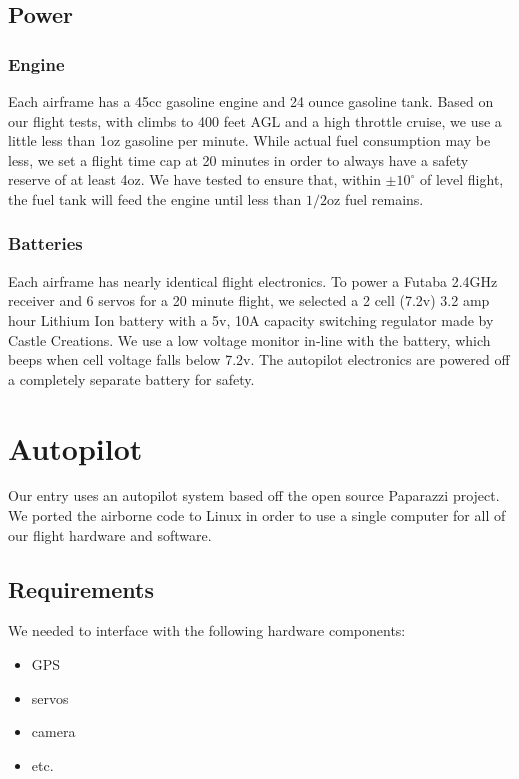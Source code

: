 \documentclass[10pt]{report}
\newcommand{\degrees}[1]
{
\begin{math}
#1^{\circ} 
\end{math}
}
\begin{document}
\subsection{Power}

\subsubsection{Engine}

Each airframe has a 45cc gasoline engine and 24 ounce gasoline tank. Based on our flight tests, with climbs to 400 feet AGL and a high throttle cruise, we use a little less than 1oz gasoline per minute. While actual fuel consumption may be less, we set a flight time cap at 20 minutes in order to always have a safety reserve of at least 4oz. We have tested to ensure that, within \degrees{\pm10} of level flight, the fuel tank will feed the engine until less than $1/2$oz fuel remains.

\subsubsection{Batteries}

Each airframe has nearly identical flight electronics. To power a Futaba 2.4GHz receiver and 6 servos for a 20 minute flight, we selected a 2 cell (7.2v) 3.2 amp hour Lithium Ion battery with a 5v, 10A capacity switching regulator made by Castle Creations. We use a low voltage monitor in-line with the battery, which beeps when cell voltage falls below 7.2v. The autopilot electronics are powered off a completely separate battery for safety.

\section{Autopilot}
Our entry uses an autopilot system based off the open source 
Paparazzi project\cite{paparazziweb}. 
We ported the airborne code to Linux in order to use a single computer for all of our flight hardware and software.

\subsection{Requirements}

We needed to interface with the following hardware components:
\begin{itemize}
	\setlength{\itemsep}{0cm}
	\setlength{\parskip}{0cm}
	\item GPS
	\item servos
	\item camera
	\item etc.
\end{itemize}
\end{document}
